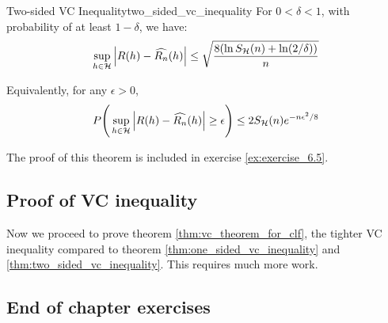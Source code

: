 \begin{theorem}{Two-sided VC Inequality}{two_sided_vc_inequality}
    For $0<\delta<1$, with probability of at least $1-\delta$, we have:
    \begin{align*}
        \sup_{h\in\mathcal{H}} \Big| 
            R(h) - \widehat{R_n}(h)
         \Big| \le \sqrt{
            \frac{8(\ln S_{\mathcal{H}}(n) + \ln(2/\delta))}{n}
        }
    \end{align*}

    \noindent Equivalently, for any $\epsilon>0$, 
    \begin{align*}
        P\Bigg( 
            \sup_{h\in\mathcal{H}} \Big| 
                R(h) - \widehat{R_n}(h)
             \Big|\ge \epsilon
         \Bigg)\le 2S_{\mathcal{H}}(n)e^{-n\epsilon^2/8}
    \end{align*}
\end{theorem}

\begin{proof*}
    The proof of this theorem is included in exercise \ref{ex:exercise_6.5}.
\end{proof*}


\subsection{Proof of VC inequality}
\noindent Now we proceed to prove theorem \ref{thm:vc_theorem_for_clf}, the tighter VC inequality compared to theorem \ref{thm:one_sided_vc_inequality} and \ref{thm:two_sided_vc_inequality}. This requires much more work.
\begin{proof*}
    
\end{proof*}
















\newpage
\subsection{End of chapter exercises}
